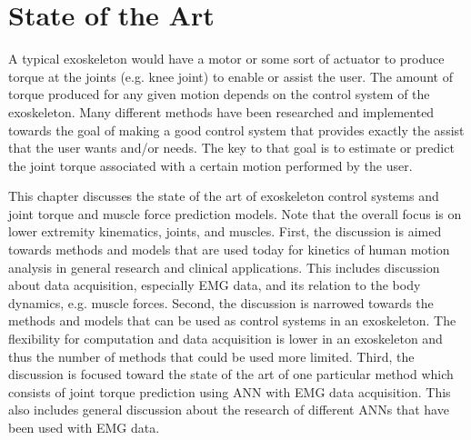 \section{State of the Art}
A typical exoskeleton would have a motor or some sort of actuator to produce torque at the joints (e.g. knee joint) to enable or assist the user.
The amount of torque produced for any given motion depends on the control system of the exoskeleton.
Many different methods have been researched and implemented towards the goal of making a good control system that provides exactly the assist that the user wants and/or needs.
The key to that goal is to estimate or predict the joint torque associated with a certain motion performed by the user.

This chapter discusses the state of the art of exoskeleton control systems and joint torque and muscle force prediction models.
Note that the overall focus is on lower extremity kinematics, joints, and muscles.
First, the discussion is aimed towards methods and models that are used today for kinetics of human motion analysis in general research and clinical applications.
This includes discussion about data acquisition, especially \ac{EMG} data, and its relation to the body dynamics, e.g. muscle forces.
Second, the discussion is narrowed towards the methods and models that can be used as control systems in an exoskeleton.
The flexibility for computation and data acquisition is lower in an exoskeleton and thus the number of methods that could be used more limited.
Third, the discussion is focused toward the state of the art of one particular method which consists of joint torque prediction using \ac{ANN} with \ac{EMG} data acquisition. 
This also includes general discussion about the research of different \acp{ANN} that have been used with \ac{EMG} data.


